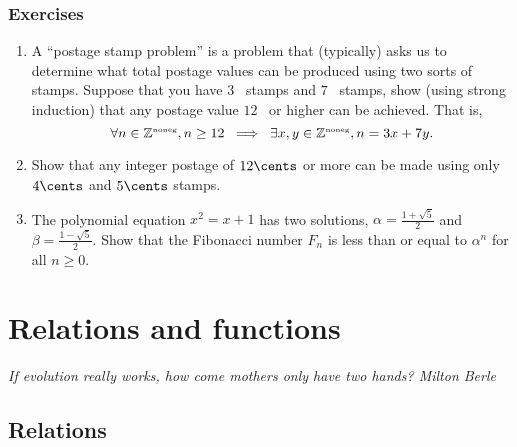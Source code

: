 \documentclass[10pt,]{book}
\theoremstyle{plain}
\theoremstyle{definition}
\theoremstyle{definition}
\numberwithin{equation}{section}
\renewcommand{\Naturals}{{\mathbb Z}^{\mbox{\tiny noneg}} }
\newcommand{\Naturals}{{\mathbb N}}
\begin{document}
\subsection[{Exercises}]{Exercises}\label{exercises-29}
\leavevmode%
\begin{enumerate}[label=(\alph*)]
\item\hypertarget{li-391}{}
          A ``postage stamp problem'' is a problem that (typically) asks
          us to determine what total postage values can be produced using two
          sorts of stamps.  Suppose that you have \(3\)\cents~ stamps and \(7\)\cents~
          stamps, show (using strong induction) that any postage value \(12\)\cents~
          or higher can be achieved.  That is,
          \begin{equation*}
            \forall n \in \Naturals, n \geq 12 \; \implies \;
            \exists x,y \in \Naturals , n = 3x + 7y.
          \end{equation*}
\item\hypertarget{li-392}{}
          Show that any integer postage of \(12 \cents\) or more can be made using
          only \(4\cents\) and \(5\cents\) stamps.
\item\hypertarget{li-393}{}
          The polynomial equation \(x^2 = x+1\) has two solutions, 
          \(\alpha = \frac{1+\sqrt{5}}{2}\) and \(\beta = \frac{1-\sqrt{5}}{2}\).
          Show that the Fibonacci number \(F_n\) is less than or equal to \(\alpha^{n}\)
          for all \(n \geq 0\).
\end{enumerate}
\typeout{************************************************}
\typeout{************************************************}
\chapter[{Relations and functions}]{Relations and functions}\label{chapter-6}
\typeout{************************************************}
\typeout{************************************************}

      \emph{If evolution really works, how come mothers only have two hands? \textendash{}Milton Berle}
\typeout{************************************************}
\typeout{************************************************}
\section[{Relations}]{Relations}\label{section-30}
\end{document}
